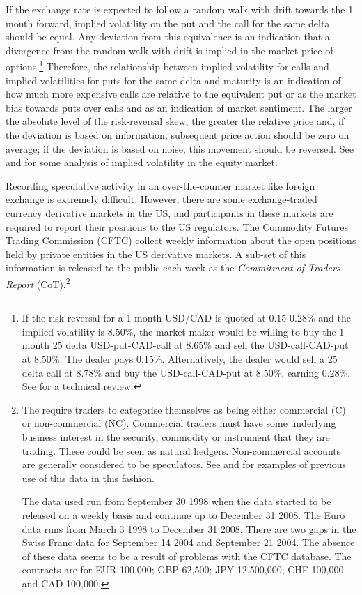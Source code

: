 \documentclass[preprint,12pt,authoryear]{elsarticle}
\begin{document}
If the exchange rate is expected to follow a random walk with drift towards the 1 month forward, implied volatility on the put and the call for the same delta should be equal.  Any deviation from this equivalence is an indication that a divergence from the random walk with drift is implied in the market price of options.\footnote{If the risk-reversal for a 1-month USD/CAD is quoted at 0.15-0.28\% and the implied volatility is 8.50\%, the market-maker would be willing to buy the 1-month 25 delta USD-put-CAD-call at 8.65\% and sell the USD-call-CAD-put at 8.50\%.  The dealer pays 0.15\%.  Alternatively, the dealer would sell a 25 delta call at 8.78\% and buy the USD-call-CAD-put at 8.50\%, earning 0.28\%. See \citet{Global} for a technical review. }  Therefore, the relationship between implied volatility for calls and implied volatilities for puts for the same delta and maturity is an indication of how much more expensive calls are relative to the equivalent put or as the market bias towards puts over calls and as an indication of market sentiment.  The larger the absolute level of the risk-reversal skew, the greater the relative price and, if the deviation is based on information, subsequent price action should be zero on average; if the deviation is based on noise, this movement should be reversed.  See \citet{Yan2011} and \citet{FengZhangFriesen} for some analysis of implied volatility in the equity market. 

Recording speculative activity in an over-the-counter market like foreign exchange is extremely difficult.  However, there are some exchange-traded currency derivative markets in the US, and participants in these markets are required to report their positions to the US regulators.  The Commodity Futures Trading Commission (CFTC) collect weekly information about the open positions held by private entities in the US derivative markets.   A sub-set of this information is released to the public each week as the \emph{Commitment of Traders Report} (CoT).\footnote{The \citet{cot} require traders to categorise themselves as being either commercial (C) or non-commercial (NC).  Commercial traders must have some underlying business interest in the security, commodity or instrument that they are trading.  These could be seen as natural hedgers.  Non-commercial accounts are generally considered to be speculators.  See \citet{FuturesSanders} and \citet{FuturesWang} for examples of previous use of this data in this fashion. 
 
The data used run from September 30 1998 when the data started to be released on a weekly basis and continue up to December 31 2008.  The Euro data runs from March 3 1998 to December 31 2008.  There are two gaps in the Swiss Franc data for September 14 2004 and September 21 2004.  The absence of these data seems to be a result of problems with the CFTC database.  The contracts are for EUR 100,000; GBP 62,500; JPY 12,500,000; CHF 100,000 and CAD 100,000.}  
\end{document}
